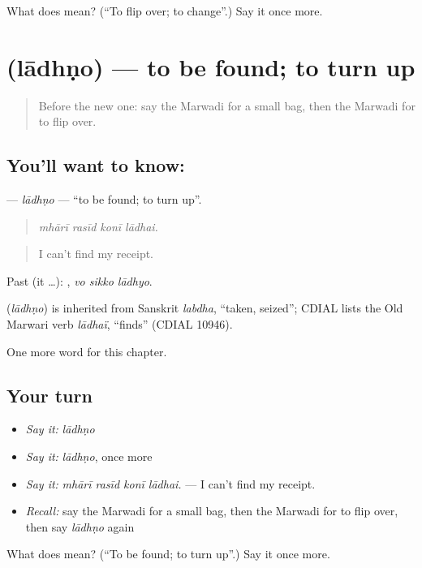 \begin{tcolorbox}[breakable,colback=teal!4,colframe=teal!35!black,title={Before you move on}]
What does  mean? (\textquotedblleft{}To flip over; to change\textquotedblright{}.) Say it once more.
\end{tcolorbox}
\section[\texorpdfstring{\mw{लाधणो} (lādhṇo)}{लाधणो (lādhṇo)}]{ (lādhṇo) — to be found; to turn up}

\label{lesson:MW-C214-ladhno}



\begin{quote}
Before the new one: say the Marwadi for a small bag, then the Marwadi for to flip over.
\end{quote}

\subsection*{You'll want to know: }
\textbf{} — \emph{lādhṇo} — \textquotedblleft{}to be found; to turn up\textquotedblright{}.

\begin{quote}
   
\end{quote}

\begin{quote}
\emph{mhārī rasīd konī lādhai.}
\end{quote}

\begin{quote}
I can't find my receipt.
\end{quote}

Past (it …):   , \emph{vo sikko lādhyo}.

\begin{cousinweb}
\textbf{} (\emph{lādhṇo}) is inherited from Sanskrit \emph{labdha}, \textquotedblleft{}taken, seized\textquotedblright{}; CDIAL lists the Old Marwari verb \emph{lādhaï}, \textquotedblleft{}finds\textquotedblright{} (CDIAL 10946).
\end{cousinweb}

\begin{grammarlens}[title={What you've built}]
One more word for this chapter.
\end{grammarlens}

\subsection*{Your turn}
\begin{itemize}
\raggedright
  \item \emph{Say it:} \emph{lādhṇo}
  \item \emph{Say it:} \emph{lādhṇo}, once more
  \item \emph{Say it:} \emph{mhārī rasīd konī lādhai.} — I can't find my receipt.
  \item \emph{Recall:} say the Marwadi for a small bag, then the Marwadi for to flip over, then say \emph{lādhṇo} again
\end{itemize}

\begin{tcolorbox}[breakable,colback=teal!4,colframe=teal!35!black,title={Before you move on}]
What does  mean? (\textquotedblleft{}To be found; to turn up\textquotedblright{}.) Say it once more.
\end{tcolorbox}
